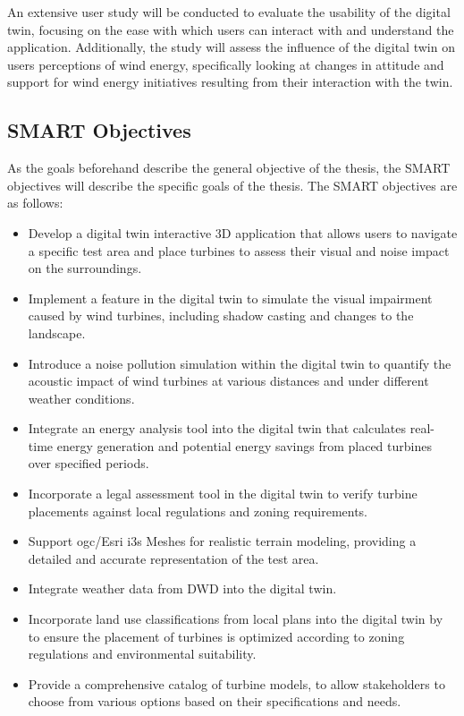 \documentclass[11pt, titlepage, a4paper]{scrartcl}
\begin{document}
\begin{linenumbers}
An extensive user study will be conducted to evaluate the usability of the digital twin, focusing on the ease with which users can interact with and understand the application. Additionally, the study will assess the influence of the digital twin on users perceptions of wind energy, specifically looking at changes in attitude and support for wind energy initiatives resulting from their interaction with the twin.





\subsection{SMART Objectives}
As the goals beforehand describe the general objective of the thesis, the SMART objectives will describe the specific goals of the thesis. The SMART objectives are as follows:
\begin{itemize}[label={--}]
    \item Develop a digital twin interactive 3D application  that allows users to navigate a specific test area and place turbines to assess their visual and noise impact on the surroundings.
    \item Implement a feature  in the digital twin to simulate the visual impairment caused by wind turbines, including shadow casting and changes to the landscape.
    \item Introduce a noise pollution simulation within the digital twin to quantify the acoustic impact of wind turbines at various distances and under different weather conditions.
    \item Integrate an energy analysis tool into the digital twin  that calculates real-time energy generation and potential energy savings from placed turbines over specified periods.
    \item Incorporate a legal assessment tool  in the digital twin to verify turbine placements against local regulations and zoning requirements.
    \item Support \gls{ogc}/Esri \gls{i3s} Meshes for realistic terrain modeling, providing a detailed and accurate representation of the test area.
    \item Integrate weather data from DWD into the digital twin.
    \item Incorporate land use classifications from local plans into the digital twin by to ensure the placement of turbines is optimized according to zoning regulations and environmental suitability.
    \item Provide a comprehensive catalog of turbine models, to allow stakeholders to choose from various options based on their specifications and needs.

\end{itemize}
\end{linenumbers}
\end{document}
